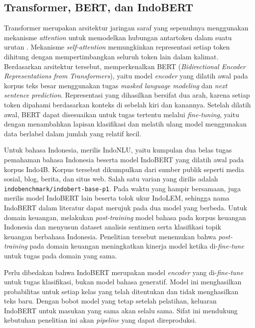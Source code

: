 \subsection{Transformer, BERT, dan IndoBERT}

Transformer merupakan arsitektur jaringan saraf yang sepenuhnya menggunakan mekanisme \emph{attention} untuk memodelkan hubungan antartoken dalam suatu urutan \autocite{vaswani2017}. Mekanisme \emph{self-attention} memungkinkan representasi setiap token dihitung dengan mempertimbangkan seluruh token lain dalam kalimat. Berdasarkan arsitektur tersebut, \textcite{devlin2019} memperkenalkan BERT (\emph{Bidirectional Encoder Representations from Transformers}), yaitu model \emph{encoder} yang dilatih awal pada korpus teks besar menggunakan tugas \emph{masked language modeling} dan \emph{next sentence prediction}. Representasi yang dihasilkan bersifat dua arah, karena setiap token dipahami berdasarkan konteks di sebelah kiri dan kanannya. Setelah dilatih awal, BERT dapat disesuaikan untuk tugas tertentu melalui \emph{fine-tuning}, yaitu dengan menambahkan lapisan klasifikasi dan melatih ulang model menggunakan data berlabel dalam jumlah yang relatif kecil.

Untuk bahasa Indonesia, \textcite{wilie2020} merilis IndoNLU, yaitu kumpulan dua belas tugas pemahaman bahasa Indonesia beserta model IndoBERT yang dilatih awal pada korpus Indo4B. Korpus tersebut dikumpulkan dari sumber publik seperti media sosial, blog, berita, dan situs web. Salah satu varian yang dirilis adalah \texttt{indobenchmark/indobert-base-p1}. Pada waktu yang hampir bersamaan, \textcite{koto2020} juga merilis model IndoBERT lain beserta tolok ukur IndoLEM, sehingga nama IndoBERT dalam literatur dapat merujuk pada dua model yang berbeda. Untuk domain keuangan, \textcite{maharani2023} melakukan \emph{post-training} model bahasa pada korpus keuangan Indonesia dan menyusun dataset analisis sentimen serta klasifikasi topik keuangan berbahasa Indonesia. Penelitian tersebut menemukan bahwa \emph{post-training} pada domain keuangan meningkatkan kinerja model ketika di-\emph{fine-tune} untuk tugas pada domain yang sama.

Perlu dibedakan bahwa IndoBERT merupakan model \emph{encoder} yang di-\emph{fine-tune} untuk tugas klasifikasi, bukan model bahasa generatif. Model ini menghasilkan probabilitas untuk setiap kelas yang telah ditentukan dan tidak menghasilkan teks baru. Dengan bobot model yang tetap setelah pelatihan, keluaran IndoBERT untuk masukan yang sama akan selalu sama. Sifat ini mendukung kebutuhan penelitian ini akan \emph{pipeline} yang dapat direproduksi.

